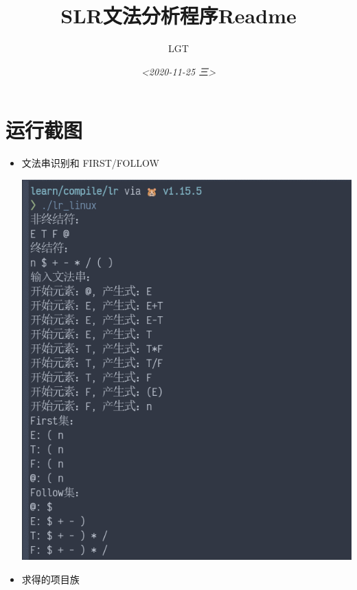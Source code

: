 \documentclass[fontset=none,UTF8,a4paper,zihao=-4]{ctexart}
\author{LGT}
\date{\textit{<2020-11-25 三>}}
\title{SLR文法分析程序Readme}
\begin{document}
\maketitle
\tableofcontents


\section{运行截图}
\label{sec:org2d65b66}
\begin{itemize}
\item 文法串识别和 FIRST/FOLLOW

\begin{center}
\includegraphics[width=.9\linewidth]{运行截图/2020-11-26_00-44-40_screenshot.png}
\end{center}

\item 求得的项目族


\end{itemize}
\end{document}
